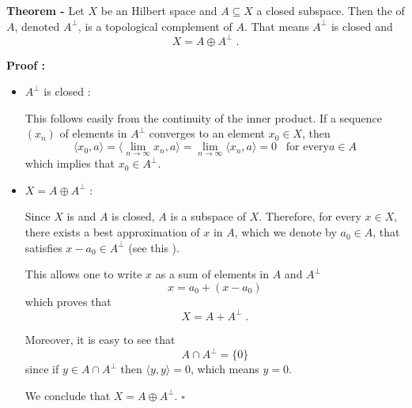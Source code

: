 \documentclass[12pt]{article}
\begin{document}
{\bf Theorem -} Let $X$ be an Hilbert space and $A \subseteq X$ a closed subspace. Then the  of $A$, denoted $A^{\perp}$, is a topological complement of $A$. That means $A^{\perp}$ is closed and
\begin{displaymath}
X =A \oplus A^{\perp} \;.
\end{displaymath}

{\bf Proof :}
\begin{itemize}
\item $A^{\perp}$ is closed : 

This follows easily from the continuity of the inner product. If a sequence $(x_n)$ of elements in $A^{\perp}$ converges to an element $x_0 \in X$, then
\begin{displaymath}
\langle x_0, a \rangle = \langle \lim_{n \rightarrow \infty} x_n, a \rangle = \lim_{n \rightarrow \infty}\langle x_n, a \rangle = 0\;\;\; \text{for every} a \in A
\end{displaymath}
which implies that $x_0 \in A^{\perp}$.

\item $X=A \oplus A^{\perp}$ : 

Since $X$ is  and $A$ is closed, $A$ is a  subspace of $X$. Therefore, for every $x \in X$, there exists a best approximation of $x$ in $A$, which we denote by $a_0 \in A$, that satisfies $x-a_0 \in A^{\perp}$ (see this ).

This allows one to write $x$ as a sum of elements in $A$ and $A^{\perp}$
\begin{displaymath}
x= a_0 + (x-a_0)
\end{displaymath}
which proves that
\begin{displaymath}
X= A + A^{\perp} \; .
\end{displaymath}

Moreover, it is easy to see that
\begin{displaymath}
A \cap A^{\perp} = \{0\}
\end{displaymath}
since if $y \in A \cap A^{\perp}$ then $\langle y, y \rangle = 0$, which means $y=0$.

We conclude that $X=A \oplus A^{\perp}$. $\square$
\end{itemize}


\end{document}
